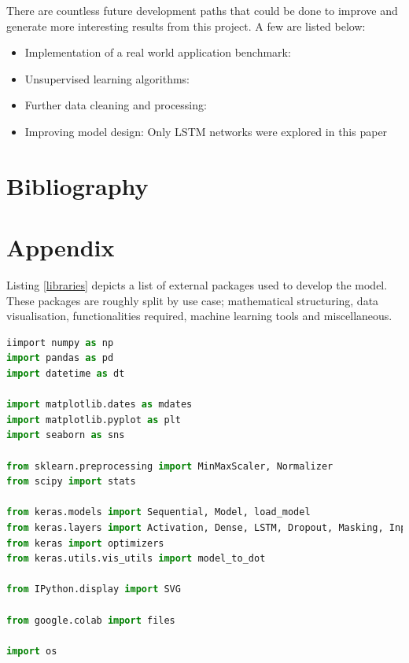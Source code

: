 \documentclass[10pt,onecolumn,letterpaper]{article}
\begin{document}
There are countless future development paths that could be done to improve and generate more interesting results from this project. A few are listed below:  

\begin{itemize}
	\item Implementation of a real world application benchmark: 
	\item Unsupervised learning algorithms:
	\item Further data cleaning and processing:
	\item Improving model design: Only LSTM networks were explored in this paper
\end{itemize}

\newpage

\section{Bibliography}

{
\small


}

\newpage
 
\section{Appendix}
Listing \ref{libraries} depicts a list of external packages used to develop the model. These packages are roughly split by use case; mathematical structuring, data visualisation, functionalities required, machine learning tools and miscellaneous. 

\begin{lstlisting}[language=Python, breaklines=true, label={libraries},]
iimport numpy as np
import pandas as pd
import datetime as dt

import matplotlib.dates as mdates
import matplotlib.pyplot as plt
import seaborn as sns

from sklearn.preprocessing import MinMaxScaler, Normalizer
from scipy import stats

from keras.models import Sequential, Model, load_model
from keras.layers import Activation, Dense, LSTM, Dropout, Masking, Input
from keras import optimizers
from keras.utils.vis_utils import model_to_dot

from IPython.display import SVG

from google.colab import files

import os
\end{lstlisting} 
\end{document}
